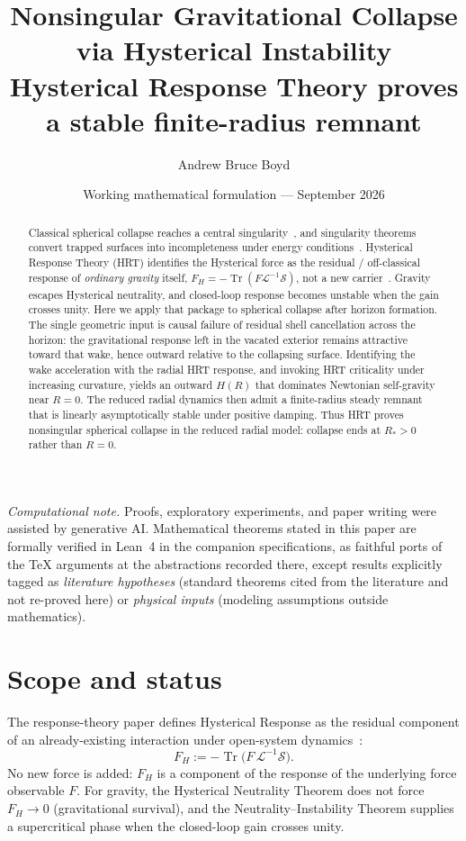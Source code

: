 \documentclass[11pt]{article}
\title{\textbf{Nonsingular Gravitational Collapse via Hysterical Instability}\\[0.35em]
\large Hysterical Response Theory proves a stable finite-radius remnant}
\author{Andrew Bruce Boyd}
\date{Working mathematical formulation --- September 2026}
\theoremstyle{definition}
\theoremstyle{remark}
\newcommand{\FH}{F_H}
\newcommand{\Tr}{\operatorname{Tr}}
\begin{document}
\maketitle
\noindent\textit{Computational note.}
Proofs, exploratory experiments, and paper writing were assisted by generative AI.
Mathematical theorems stated in this paper are formally verified in Lean~4 in the
companion specifications, as faithful ports of the TeX arguments at the abstractions
recorded there, except results explicitly tagged as \emph{literature hypotheses}
(standard theorems cited from the literature and not re-proved here) or
\emph{physical inputs} (modeling assumptions outside mathematics).

\begin{abstract}
Classical spherical collapse reaches a central singularity~\cite{OppenheimerSnyder1939},
and singularity theorems convert trapped surfaces into incompleteness under energy
conditions~\cite{Penrose1965}.
Hysterical Response Theory (HRT) identifies the Hysterical force as the residual /
off-classical response of \emph{ordinary gravity} itself,
$\FH=-\Tr(F\mathcal L^{-1}\mathcal S)$, not a new carrier~\cite{boyd2026response}.
Gravity escapes Hysterical neutrality, and closed-loop response becomes unstable when
the gain crosses unity.
Here we apply that package to spherical collapse after horizon formation.
The single geometric input is causal failure of residual shell cancellation across the
horizon: the gravitational response left in the vacated exterior remains attractive
toward that wake, hence outward relative to the collapsing surface.
Identifying the wake acceleration with the radial HRT response, and invoking
HRT criticality under increasing curvature, yields an outward $H(R)$ that dominates
Newtonian self-gravity near $R=0$.
The reduced radial dynamics then admit a finite-radius steady remnant that is linearly
asymptotically stable under positive damping.
Thus HRT proves nonsingular spherical collapse in the reduced radial model: collapse
ends at $R_\ast>0$ rather than $R=0$.
\end{abstract}
\tableofcontents
\newpage

\section{Scope and status}
\label{sec:scope}
The response-theory paper defines Hysterical Response as the residual component of an
already-existing interaction under open-system dynamics~\cite{boyd2026response}:
\begin{equation}
\label{eq:FH}
\boxed{\FH:=-\Tr\!\bigl(F\,\mathcal L^{-1}\mathcal S\bigr).}
\end{equation}
No new force is added: $\FH$ is a component of the response of the underlying force
observable $F$.
For gravity, the Hysterical Neutrality Theorem does not force $\FH\to0$ (gravitational
survival), and the Neutrality--Instability Theorem supplies a supercritical phase when
the closed-loop gain crosses unity.
\end{document}

